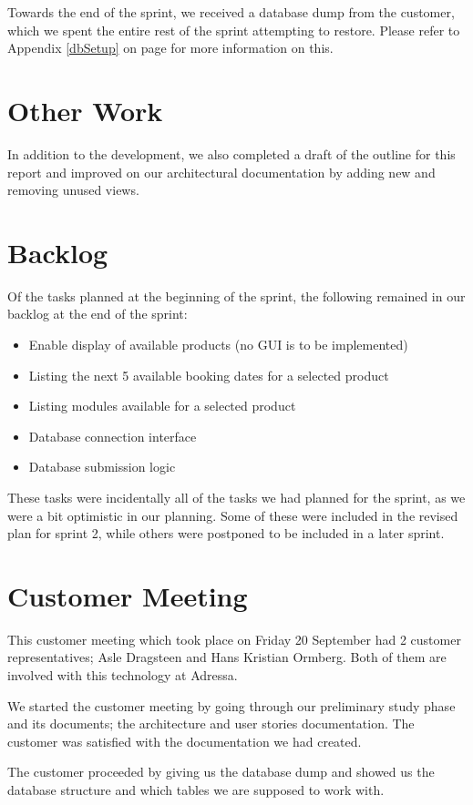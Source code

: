 Towards the end of the sprint, we received a database dump from the customer, which we spent the entire rest of the sprint attempting to restore. Please refer to Appendix \ref{dbSetup} on page \pageref{dbSetup} for more information on this.

\section{Other Work}
In addition to the development, we also completed a draft of the outline for this report and improved on our architectural documentation by adding new and removing unused views.

\section{Backlog}
Of the tasks planned at the beginning of the sprint, the following remained in our backlog at the end of the sprint:
\begin{itemize}
	\item Enable display of available products (no GUI is to be implemented)
	\item Listing the next 5 available booking dates for a selected product
	\item Listing modules available for a selected product
	\item Database connection interface
	\item Database submission logic
\end{itemize}

These tasks were incidentally all of the tasks we had planned for the sprint, as we were a bit optimistic in our planning. Some of these were included in the revised plan for sprint 2, while others were postponed to be included in a later sprint.

\section{Customer Meeting}
This customer meeting which took place on Friday 20 September had 2 customer representatives; Asle Dragsteen and Hans Kristian Ormberg. Both of them are involved with this technology at Adressa.
 
We started the customer meeting by going through our preliminary study phase and its documents; the architecture and user stories documentation. The customer was satisfied with the documentation we had created.

The customer proceeded by giving us the database dump and showed us the database structure and which tables we are supposed to work with.

